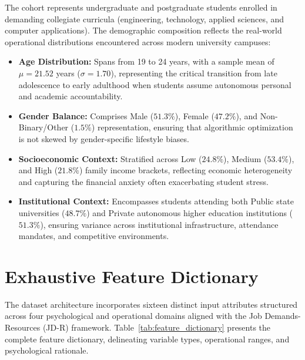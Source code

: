 \documentclass[12pt,a4paper,oneside]{report}
\begin{document}
The cohort represents undergraduate and postgraduate students enrolled in demanding collegiate curricula (engineering, technology, applied sciences, and computer applications). The demographic composition reflects the real-world operational distributions encountered across modern university campuses:
\begin{itemize}
    \item \textbf{Age Distribution:} Spans from 19 to 24 years, with a sample mean of $\mu = 21.52$ years ($\sigma = 1.70$), representing the critical transition from late adolescence to early adulthood when students assume autonomous personal and academic accountability.
    \item \textbf{Gender Balance:} Comprises Male ($51.3\%$), Female ($47.2\%$), and Non-Binary/Other ($1.5\%$) representation, ensuring that algorithmic optimization is not skewed by gender-specific lifestyle biases.
    \item \textbf{Socioeconomic Context:} Stratified across Low ($24.8\%$), Medium ($53.4\%$), and High ($21.8\%$) family income brackets, reflecting economic heterogeneity and capturing the financial anxiety often exacerbating student stress.
    \item \textbf{Institutional Context:} Encompasses students attending both Public state universities ($48.7\%$) and Private autonomous higher education institutions ($51.3\%$), ensuring variance across institutional infrastructure, attendance mandates, and competitive environments.
\end{itemize}

\section{Exhaustive Feature Dictionary}
\label{sec:feature_dictionary}
The dataset architecture incorporates sixteen distinct input attributes structured across four psychological and operational domains aligned with the Job Demands-Resources (JD-R) framework. Table~\ref{tab:feature_dictionary} presents the complete feature dictionary, delineating variable types, operational ranges, and psychological rationale.
\end{document}
